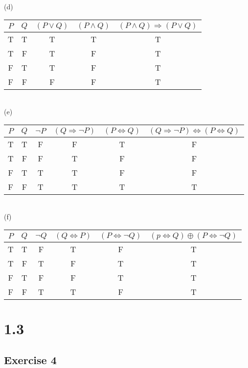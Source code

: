 \documentclass[12pt]{article}
\begin{document}
(d)
\begin{tabular}{|c|c|c|c|c|}
    \hline 
    $P$ & $Q$ & $(P\lor Q)$ & $(P\land Q)$ & $(P\land Q)\Rightarrow (P\lor Q)$\\
    \hline 
    T&T&T&T&T\\
    \hline 
    T&F&T&F&T\\
    \hline 
    F&T&T&F&T\\
    \hline 
    F&F&F&F&T\\
    \hline 
\end{tabular}
\\


(e)
\begin{tabular}{|c|c|c|c|c|c|}
    \hline 
    $P$ & $Q$ & $\lnot P$ & $(Q\Rightarrow \lnot P)$ & $(P\Leftrightarrow Q)$ & $(Q\Rightarrow \lnot P)\Leftrightarrow (P\Leftrightarrow Q)$\\
    \hline 
    T&T&F&F&T&F\\
    \hline 
    T&F&F&T&F&F\\
    \hline 
    F&T&T&T&F&F\\
    \hline 
    F&F&T&T&T&T\\
    \hline 
\end{tabular}
\\

(f)
\begin{tabular}{|c|c|c|c|c|c|}
    \hline 
    $P$ & $Q$ & $\lnot Q$ & $(Q\Leftrightarrow  P)$ & $(P\Leftrightarrow \lnot Q)$ & $(p\Leftrightarrow Q)\oplus (P\Leftrightarrow \lnot Q)$\\
    \hline 
    T&T&F&T&F&T\\
    \hline 
    T&F&T&F&T&T\\
    \hline 
    F&T&F&F&T&T\\
    \hline 
    F&F&T&T&F&T\\
    \hline 
\end{tabular}

\section*{1.3}

\subsection*{Exercise 4}
\end{document}
